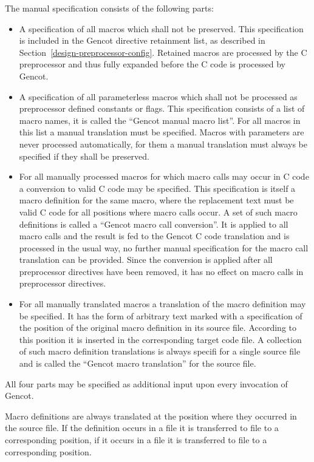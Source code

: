 The manual specification consists of the following parts:
\begin{itemize}
\item A specification of all macros which shall not be preserved. This specification is included in the 
Gencot directive retainment list, as described in 
Section~\ref{design-preprocessor-config}. Retained macros are processed by the C preprocessor and thus 
fully expanded before the C code is processed by Gencot.
\item A specification of all parameterless macros which shall not be processed as preprocessor defined
constants or flags. This specification consists of a list of macro names, it is called the ``Gencot manual macro list''.
For all macros in this list a manual translation must be specified. Macros with parameters are never 
processed automatically, for them a manual translation must always be specified if they shall be preserved.
\item For all manually processed macros for which macro calls may occur in C code a conversion to valid C 
code may be specified.
This specification is itself a macro definition for the same macro, where the replacement text must be valid
C code for all positions where macro calls occur. A set of such macro definitions is called a ``Gencot macro 
call conversion''. It is applied to all macro calls and the result is fed to 
the Gencot C code translation and is processed in the usual way, no further manual specification for the macro call
translation can be provided. Since the conversion is applied after all preprocessor directives have been
removed, it has no effect on macro calls in preprocessor directives. 
\item For all manually translated macros a translation of the macro definition may be specified. It has the form 
of arbitrary text marked with a specification of the position of the original macro definition in its source file.
According to this position it is inserted in the corresponding target code file. A collection of such macro 
definition translations is always specifi for a single source file and is called the ``Gencot macro translation''
for the source file.
\end{itemize}
All four parts may be specified as additional input upon every invocation of Gencot.

Macro definitions are always translated at the position where they occurred in the source file.
If the definition occurs in a file  it is transferred to file  to a corresponding position,
if it occurs in a file  it is transferred to file  to a corresponding position.

